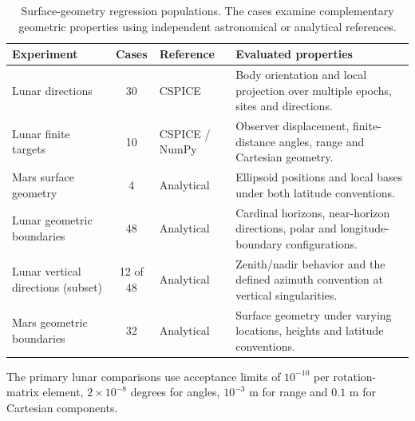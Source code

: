 \begin{table}[!tbp]
    \centering
    \caption{Surface-geometry regression
        populations. The cases examine
        complementary geometric properties
        using independent astronomical
        or analytical references.}
    \label{tab:surface-method}
    \footnotesize
    \begin{tabularx}{\textwidth}{@{}lclX@{}}
        \toprule
        Experiment & Cases                      & Reference
                   & Evaluated properties                        \\
        \midrule
        Lunar directions
                   & 30                         & CSPICE
                   & Body orientation and local
        projection over multiple
        epochs, sites and directions.                            \\
        Lunar finite targets
                   & 10                         & CSPICE / NumPy
                   & Observer displacement,
        finite-distance angles,
        range and Cartesian geometry.                            \\
        Mars surface geometry
                   & 4                          & Analytical
                   & Ellipsoid positions and
        local bases under both
        latitude conventions.                                    \\
        Lunar geometric boundaries
                   & 48                         & Analytical
                   & Cardinal horizons,
        near-horizon directions,
        polar and longitude-boundary
        configurations.                                          \\
        Lunar vertical directions (subset)
                   & 12 of 48                   & Analytical
                   & Zenith/nadir behavior and
        the defined azimuth convention
        at vertical singularities.                               \\
        Mars geometric boundaries
                   & 32                         & Analytical
                   & Surface geometry under
        varying locations, heights
        and latitude conventions.                                \\
        \bottomrule
    \end{tabularx}
\end{table}

The primary lunar comparisons use acceptance limits of $10^{-10}$ per rotation-matrix element,
$2\times10^{-8}$ degrees for angles, $10^{-3}$ m for range and $0.1$ m for Cartesian components.

